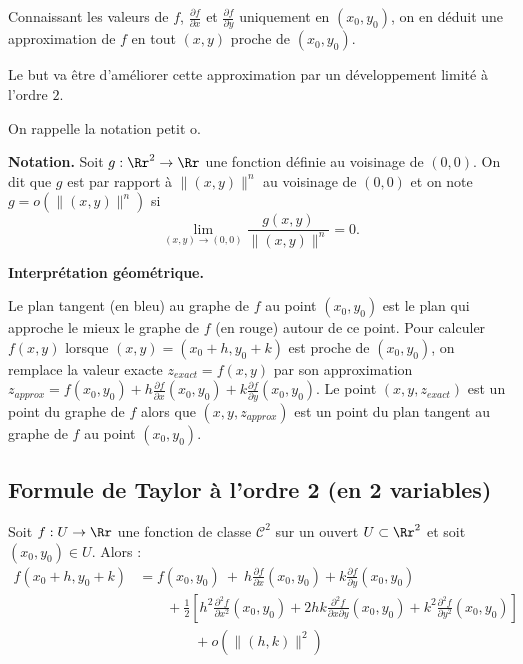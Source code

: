 Connaissant les valeurs de $f$, $\frac{\partial f}{\partial x}$
et $\frac{\partial f}{\partial y}$ uniquement en $(x_0,y_0)$, on en déduit une approximation de $f$ en tout $(x,y)$ proche de $(x_0,y_0)$.

\medskip

Le but va être d'améliorer cette approximation par un développement limité à l'ordre $2$.

On rappelle la notation \og{}petit o\fg{}.

\textbf{Notation.} Soit $g :\Rr^2\to \Rr$ une fonction définie au voisinage de $(0,0)$. On dit que $g$ est  par rapport à $\|(x,y)\|^n$ au voisinage de $(0,0)$ et on note $g=o\left(\|(x,y)\|^n\right)$ si 
$$\lim_{(x,y)\to(0,0)}\frac{g(x,y)}{\|(x,y)\|^n}=0.$$

\textbf{Interprétation géométrique.}

Le plan tangent (en bleu) au graphe de $f$ au point $(x_0,y_0)$ est le plan qui approche le mieux le graphe de $f$ (en rouge) autour de ce point.
Pour calculer $f(x,y)$ lorsque $(x,y)=(x_0+h,y_0+k)$ est proche de $(x_0,y_0)$, on remplace la valeur exacte $z_{exact} = f(x,y)$ 
par son approximation $z_{approx} = f(x_0,y_0)+h\frac{\partial f}{\partial x}(x_0,y_0)+k\frac{\partial f}{\partial y}(x_0,y_0)$.
Le point $(x,y,z_{exact})$ est un point du graphe de $f$ alors que
$(x,y,z_{approx})$ est un point du plan tangent au graphe de $f$ au point $(x_0,y_0)$. 




\subsection{Formule de Taylor à l'ordre 2 (en 2 variables)}

\begin{theoreme}{}{}    
Soit $f:U \to \Rr$ une fonction de classe $\mathcal{C}^2$ sur un ouvert $U\subset \Rr^2$ et soit $(x_0,y_0)\in U$.  Alors :
\begin{align*}
f(x_0+h,y_0+k) 
& = f(x_0,y_0)
\ + \  h\frac{\partial f}{\partial x}(x_0,y_0)
+k\frac{\partial f}{\partial y}(x_0,y_0) \\
& \qquad +\frac{1}{2}\left[
h^2\frac{\partial ^2f}{\partial x^2}(x_0,y_0)
+2hk\frac{\partial ^2f}{\partial x\partial y}(x_0,y_0)
+k^2\frac{\partial ^2f}{\partial y^2}(x_0,y_0)
\right] \\ 
& \qquad \qquad +o\left(\|(h,k)\|^2\right)
\end{align*}
   
\end{theoreme}


